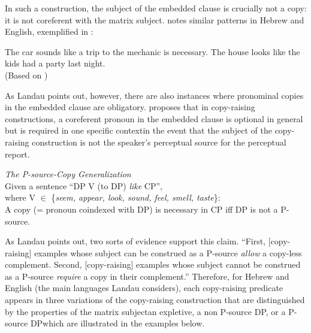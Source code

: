 \documentclass[output=paper,colorlinks,citecolor=brown
]{langscibook}
\begin{document}
\noindent In such a construction, the subject of the embedded clause is crucially not a copy: it is not coreferent with the matrix subject. \citet{Landau:2009:CopyRaising,Landau:2011:CopyRaising} notes similar patterns in Hebrew and English, exemplified in :

\newpage
\ea \label{ex:Johnson:landau'sexample}
\begin{xlist}
\ex The car sounds like a trip to the mechanic is necessary.
\ex The house looks like the kids had a party last night. \\ (Based on \citealt{Landau:2011:CopyRaising})
\end{xlist}
\z

As Landau points out, however, there are also instances where pronominal copies in the embedded clause are obligatory. \citet{Landau:2011:CopyRaising} proposes that in copy-raising constructions, a coreferent pronoun in the embedded clause is optional in general but is required in one specific context\textemdash in the event that the subject of the copy-raising construction is not the speaker's perceptual source for the perceptual report.

 

\ea \label{ex:johnson:LandauGeneralization} \textit{The P-source-Copy Generalization} \citep[(26)]{Landau:2011:CopyRaising} \\
Given a sentence ``DP V (to DP) \textit{like} CP'',\\
where V $\in$ \{\textit{seem, appear, look, sound, feel, smell, taste}\}: \\
A copy (= pronoun coindexed with DP) is necessary in CP iff DP is not a P-source.
\z 

As Landau points out, two sorts of evidence support this claim. ``First, [copy-raising] examples whose subject can be construed as a P-source \textit{allow} a copy-less complement. Second, [copy-raising] examples whose subject cannot be construed as a P-source \textit{require} a copy in their complement.'' Therefore, for Hebrew and English (the main languages Landau considers), each copy-raising predicate appears in three variations of the copy-raising construction that are distinguished by the properties of the matrix subject\textemdash an expletive, a non P-source DP, or a P-source DP\textemdash which are illustrated in the examples below. 
\end{document}
